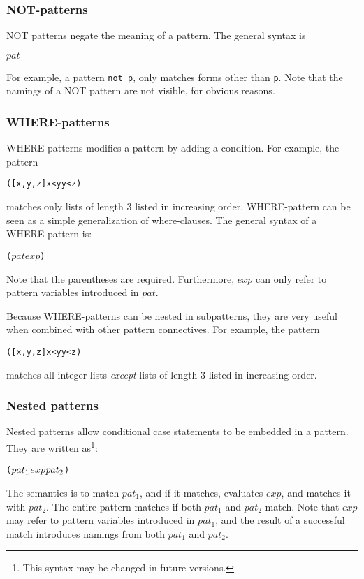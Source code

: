 \subsubsection{NOT-patterns} NOT patterns negate the meaning of a pattern.
The general syntax is
\begin{alltt}
   \NOT \(pat\)
\end{alltt}
For example, a pattern \verb|not p|, only matches forms other than \verb|p|.
Note that the namings of a NOT pattern are not visible, for obvious reasons.

\subsubsection{WHERE-patterns} WHERE-patterns modifies a pattern by adding
a condition.  For example, the pattern
\begin{alltt}
    ([x,y,z] \WHERE x<y \AND y<z)
\end{alltt}
matches only lists of length 3 listed in increasing order.   
WHERE-pattern can be seen as a simple generalization
of where-clauses.  The general syntax of a WHERE-pattern is:
\begin{alltt}
    (\(pat\) \WHERE \(exp\))
\end{alltt}
Note that the parentheses are required.  Furthermore, $exp$ can only 
refer to pattern variables introduced in \(pat\).

Because WHERE-patterns can be nested in subpatterns, 
they are very useful when combined with other pattern connectives.
For example, the pattern
\begin{alltt}
    \NOT ([x,y,z] \WHERE x<y \AND y<z)
\end{alltt}
matches all integer lists {\em except} lists of length 3 listed in increasing order.  

\subsubsection{Nested patterns} Nested patterns allow conditional case statements to
be embedded in a pattern.  They are written as\footnote{This syntax may be 
changed in future versions.}:
\begin{alltt}
   (\(pat\sb{1}\) \WHERE \(exp\) \IN \(pat\sb{2}\))
\end{alltt}
  The semantics is to match $pat_1$, and if it matches, evaluates
$exp$, and matches it with $pat_2$.  The entire pattern matches if
both $pat_1$ and $pat_2$ match.  Note that $exp$ may refer to pattern
variables introduced in $pat_1$, and the result of a successful match introduces
namings from both $pat_1$ and $pat_2$.

